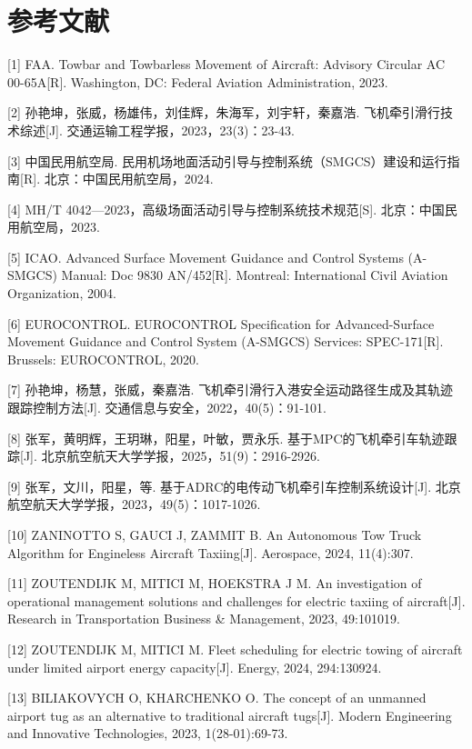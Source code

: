 \section*{参考文献}

{[}1{]} FAA. Towbar and Towbarless Movement of Aircraft: Advisory
Circular AC 00-65A{[}R{]}. Washington, DC: Federal Aviation
Administration, 2023.

{[}2{]} 孙艳坤，张威，杨雄伟，刘佳辉，朱海军，刘宇轩，秦嘉浩.
飞机牵引滑行技术综述{[}J{]}. 交通运输工程学报，2023，23(3)：23-43.

{[}3{]} 中国民用航空局.
民用机场地面活动引导与控制系统（SMGCS）建设和运行指南{[}R{]}.
北京：中国民用航空局，2024.

{[}4{]} MH/T 4042---2023，高级场面活动引导与控制系统技术规范{[}S{]}.
北京：中国民用航空局，2023.

{[}5{]} ICAO. Advanced Surface Movement Guidance and Control Systems
(A-SMGCS) Manual: Doc 9830 AN/452{[}R{]}. Montreal: International Civil
Aviation Organization, 2004.

{[}6{]} EUROCONTROL. EUROCONTROL Specification for Advanced-Surface
Movement Guidance and Control System (A-SMGCS) Services:
SPEC-171{[}R{]}. Brussels: EUROCONTROL, 2020.

{[}7{]} 孙艳坤，杨慧，张威，秦嘉浩.
飞机牵引滑行入港安全运动路径生成及其轨迹跟踪控制方法{[}J{]}.
交通信息与安全，2022，40(5)：91-101.

{[}8{]} 张军，黄明辉，王玥琳，阳星，叶敏，贾永乐.
基于MPC的飞机牵引车轨迹跟踪{[}J{]}.
北京航空航天大学学报，2025，51(9)：2916-2926.

{[}9{]} 张军，文川，阳星，等.
基于ADRC的电传动飞机牵引车控制系统设计{[}J{]}.
北京航空航天大学学报，2023，49(5)：1017-1026.

{[}10{]} ZANINOTTO S, GAUCI J, ZAMMIT B. An Autonomous Tow Truck
Algorithm for Engineless Aircraft Taxiing{[}J{]}. Aerospace, 2024,
11(4):307.

{[}11{]} ZOUTENDIJK M, MITICI M, HOEKSTRA J M. An investigation of
operational management solutions and challenges for electric taxiing of
aircraft{[}J{]}. Research in Transportation Business \& Management,
2023, 49:101019.

{[}12{]} ZOUTENDIJK M, MITICI M. Fleet scheduling for electric towing of
aircraft under limited airport energy capacity{[}J{]}. Energy, 2024,
294:130924.

{[}13{]} BILIAKOVYCH O, KHARCHENKO O. The concept of an unmanned airport
tug as an alternative to traditional aircraft tugs{[}J{]}. Modern
Engineering and Innovative Technologies, 2023, 1(28-01):69-73.


